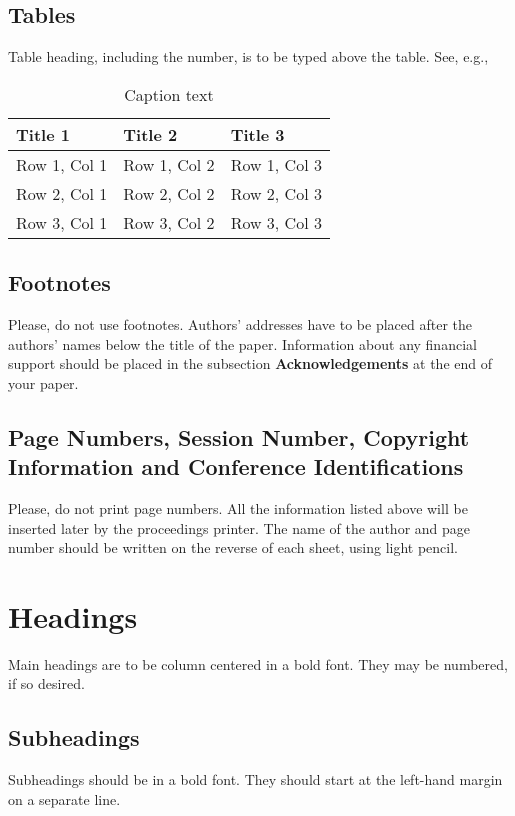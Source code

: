 \subsection{Tables}
Table heading, including the number, is to be typed
above the table. See, e.g.,
\begin{table}[htb]
\begin{center}
\caption{Caption text}
\begin{tabular}{lll}
\hline
Title 1 & Title 2 & Title 3\\
\hline
Row 1, Col 1 & Row 1, Col 2 & Row 1, Col 3\\
Row 2, Col 1 & Row 2, Col 2 & Row 2, Col 3\\
Row 3, Col 1 & Row 3, Col 2 & Row 3, Col 3\\
\hline
\end{tabular}
\end{center}
\end{table}

\subsection{Footnotes}
Please, do not use footnotes.
Authors' addresses have to be
placed after the authors' names below the title of the paper.
Information about any financial support should be placed
in the subsection {\bf Acknowledgements} at the end of your paper.

\subsection{Page Numbers, Session Number,
Copyright Information and Conference Identifications}

Please, do not print page numbers.
All the information listed above
will be inserted later by the proceedings printer.
The name of the author and page number should be written on the
reverse of each sheet, using light pencil.

\section{Headings}

Main headings are to be column centered in a bold font.
They may be numbered, if so desired.

\subsection{Subheadings}
Subheadings should be in a bold font. They should start at
the left-hand margin on a separate line.

